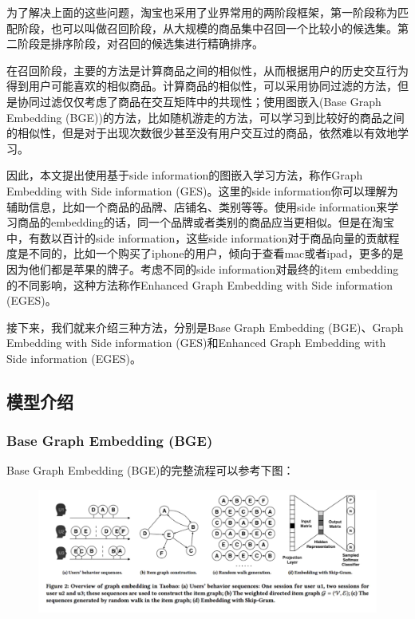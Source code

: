 \documentclass[12pt]{article}
\begin{document}
为了解决上面的这些问题，淘宝也采用了业界常用的两阶段框架，第一阶段称为匹配阶段，也可以叫做召回阶段，从大规模的商品集中召回一个比较小的候选集。第二阶段是排序阶段，对召回的候选集进行精确排序。

在召回阶段，主要的方法是计算商品之间的相似性，从而根据用户的历史交互行为得到用户可能喜欢的相似商品。计算商品的相似性，可以采用协同过滤的方法，但是协同过滤仅仅考虑了商品在交互矩阵中的共现性；使用图嵌入(Base Graph Embedding (BGE))的方法，比如随机游走的方法，可以学习到比较好的商品之间的相似性，但是对于出现次数很少甚至没有用户交互过的商品，依然难以有效地学习。

因此，本文提出使用基于side information的图嵌入学习方法，称作Graph Embedding with Side information (GES)。这里的side information你可以理解为辅助信息，比如一个商品的品牌、店铺名、类别等等。使用side information来学习商品的embedding的话，同一个品牌或者类别的商品应当更相似。但是在淘宝中，有数以百计的side information，这些side information对于商品向量的贡献程度是不同的，比如一个购买了iphone的用户，倾向于查看mac或者ipad，更多的是因为他们都是苹果的牌子。考虑不同的side information对最终的item embedding的不同影响，这种方法称作Enhanced Graph Embedding with Side information (EGES)。

接下来，我们就来介绍三种方法，分别是Base Graph Embedding (BGE)、Graph Embedding with Side information (GES)和Enhanced Graph Embedding with Side information (EGES)。

\subsection{模型介绍}
\subsubsection{Base Graph Embedding (BGE)}
Base Graph Embedding (BGE)的完整流程可以参考下图：
\begin{figure}[H]
    \centering
    \includegraphics[width=1\textwidth]{fig/Graph_Embedding_BGE.png}
\end{figure}
\end{document}
